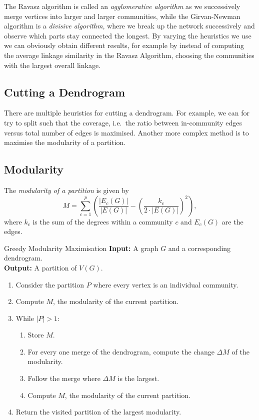 \documentclass[english]{panikzettel}
\begin{document}
The Ravasz algorithm is called an \textit{agglomerative algorithm} as we successively merge vertices into larger and larger communities, while the Girvan-Newman algorithm is a \textit{divisive algorithm}, where we break up the network successively and observe which parts stay connected the longest.
By varying the heuristics we use we can obviously obtain different results, for example by instead of computing the average linkage similarity in the Ravasz Algorithm, choosing the communities with the largest overall linkage.

\subsection{Cutting a Dendrogram}

There are multiple heuristics for cutting a dendrogram. For example, we can for try to split such that the coverage, i.e.\ the ratio between in-community edges versus total number of edges is maximised. Another more complex method is to maximise the modularity of a partition.

\subsection{Modularity}

The \emph{modularity of a partition} is given by
\[
    M= \sum_{c=1}^p \left(\frac{|E_c(G)|}{|E(G)|} - \left(\frac{k_c}{2\cdot|E(G)|}\right)^2 \right),
\]
where $k_c$ is the sum of the degrees within a community $c$ and $E_c(G)$ are the edges.

\begin{algo}{Greedy Modularity Maximisation}
    \textbf{Input:} A graph $G$ and a corresponding dendrogram. \\
    \textbf{Output:} A partition of $V(G)$.
    \tcblower
    \begin{enumerate}
            \item Consider the partition $P$ where every vertex is an individual community.
            \item Compute $M$, the modularity of the current partition.
            \item While $|P| > 1$:
                \begin{enumerate}
                        \item Store $M$.
                        \item For every one merge of the dendrogram, compute the change $\Delta M$ of the modularity.
                        \item Follow the merge where $\Delta M$ is the largest.
                        \item Compute $M$, the modularity of the current partition.
                \end{enumerate}
            \item Return the visited partition of the largest modularity.
    \end{enumerate}
\end{algo}
\end{document}
